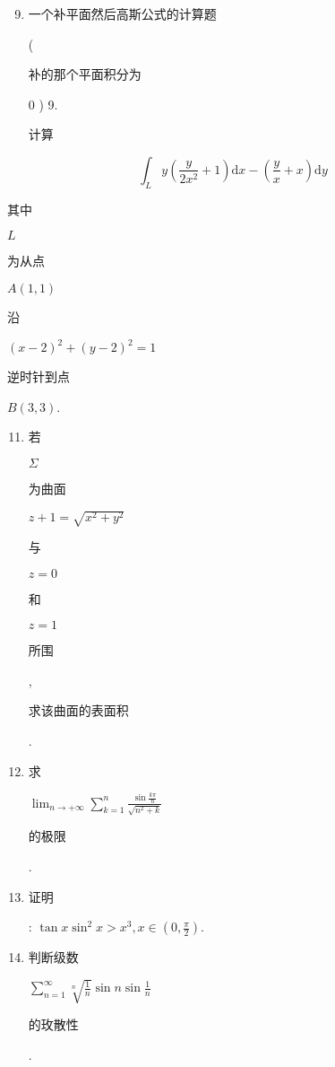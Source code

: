\documentclass[10pt]{article}
\begin{document}
\begin{enumerate}
  \setcounter{enumi}{8}
  \item \begin{CJK}{UTF8}{mj}一个补平面然后高斯公式的计算题\end{CJK} (\begin{CJK}{UTF8}{mj}补的那个平面积分为\end{CJK} 0 ) 9. \begin{CJK}{UTF8}{mj}计算\end{CJK}
\end{enumerate}
$$
\int_{L} y\left(\frac{y}{2 x^{2}}+1\right) \mathrm{d} x-\left(\frac{y}{x}+x\right) \mathrm{d} y
$$
\begin{CJK}{UTF8}{mj}其中\end{CJK} $L$ \begin{CJK}{UTF8}{mj}为从点\end{CJK} $A(1,1)$ \begin{CJK}{UTF8}{mj}沿\end{CJK} $(x-2)^{2}+(y-2)^{2}=1$ \begin{CJK}{UTF8}{mj}逆时针到点\end{CJK} $B(3,3)$.

\begin{enumerate}
  \setcounter{enumi}{10}
  \item \begin{CJK}{UTF8}{mj}若\end{CJK} $\Sigma$ \begin{CJK}{UTF8}{mj}为曲面\end{CJK} $z+1=\sqrt{x^{2}+y^{2}}$ \begin{CJK}{UTF8}{mj}与\end{CJK} $z=0$ \begin{CJK}{UTF8}{mj}和\end{CJK} $z=1$ \begin{CJK}{UTF8}{mj}所围\end{CJK}, \begin{CJK}{UTF8}{mj}求该曲面的表面积\end{CJK}.

  \item \begin{CJK}{UTF8}{mj}求\end{CJK} $\lim _{n \rightarrow+\infty} \sum_{k=1}^{n} \frac{\sin \frac{k \pi}{n}}{\sqrt{n^{2}+k}}$ \begin{CJK}{UTF8}{mj}的极限\end{CJK}.

  \item \begin{CJK}{UTF8}{mj}证明\end{CJK}: $\tan x \sin ^{2} x>x^{3}, x \in\left(0, \frac{\pi}{2}\right)$.

  \item \begin{CJK}{UTF8}{mj}判断级数\end{CJK} $\sum_{n=1}^{\infty} \sqrt[n]{\frac{1}{n}} \sin n \sin \frac{1}{n}$ \begin{CJK}{UTF8}{mj}的玫散性\end{CJK}.

\end{enumerate}
\end{document}

